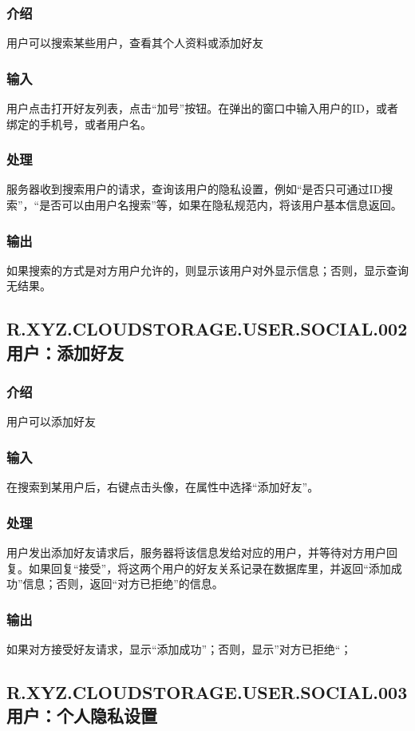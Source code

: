 {\subsubsection{介绍}
用户可以搜索某些用户，查看其个人资料或添加好友
\subsubsection{输入}
用户点击打开好友列表，点击“加号”按钮。在弹出的窗口中输入用户的ID，或者绑定的手机号，或者用户名。
\subsubsection{处理}
服务器收到搜索用户的请求，查询该用户的隐私设置，例如“是否只可通过ID搜索”，“是否可以由用户名搜索”等，如果在隐私规范内，将该用户基本信息返回。
\subsubsection{输出}
如果搜索的方式是对方用户允许的，则显示该用户对外显示信息；否则，显示查询无结果。

\subsection{R.XYZ.CLOUDSTORAGE.USER.SOCIAL.002 用户：添加好友}
\subsubsection{介绍}
用户可以添加好友
\subsubsection{输入}
在搜索到某用户后，右键点击头像，在属性中选择“添加好友”。
\subsubsection{处理}
用户发出添加好友请求后，服务器将该信息发给对应的用户，并等待对方用户回复。如果回复“接受”，将这两个用户的好友关系记录在数据库里，并返回“添加成功”信息；否则，返回“对方已拒绝”的信息。
\subsubsection{输出}
如果对方接受好友请求，显示“添加成功”；否则，显示”对方已拒绝“；

\subsection{R.XYZ.CLOUDSTORAGE.USER.SOCIAL.003 用户：个人隐私设置}
}
